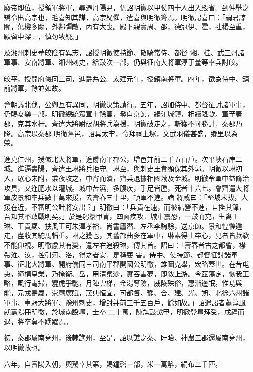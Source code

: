 \begin{pinyinscope}
 廢帝即位，授領軍將軍，尋遷丹陽尹，仍詔明徹以甲仗四十人出入殿省。到仲舉之矯令出高宗也，毛喜知其謀，高宗疑懼，遣喜與明徹籌焉。明徹謂喜曰：「嗣君諒闇，萬機多闕，外鄰彊敵，內有大喪。殿下親實周、邵，德冠伊、霍，社稷至重，願留中深計，慎勿致疑。」



 及湘州刺史華皎陰有異志，詔授明徹使持節、散騎常侍、都督
 湘、桂、武三州諸軍事、安南將軍、湘州刺史，給鼓吹一部，仍與征南大將軍淳于量等率兵討皎。



 皎平，授開府儀同三司，進爵為公。太建元年，授鎮南將軍。四年，徵為侍中、鎮前將軍，餘並如故。



 會朝議北伐，公卿互有異同，明徹決策請行。五年，詔加侍中、都督征討諸軍事，仍賜女樂一部。明徹總統眾軍十餘萬，發自京師，緣江城鎮，相續降款。軍至秦郡，克其水柵。齊遣大將尉破胡將兵為援，明徹破走之，斬獲不可勝計，秦郡乃降。高宗以秦郡
 明徹舊邑，詔具太牢，令拜祠上塚，文武羽儀甚盛，鄉里以為榮。



 進克仁州，授徵北大將軍，進爵南平郡公，增邑并前二千五百戶。次平峽石岸二城。進逼壽陽，齊遣王琳將兵拒守。琳至，與刺史王貴顯保其外郭。明徹以琳初入，眾心未附，乘夜攻之，中宵而潰，齊兵退據相國城及金城。明徹令軍中益脩治攻具，又迮肥水以灌城。城中苦濕，多腹疾，手足皆腫，死者十六七。會齊遣大將軍皮景和率兵數十萬來援，去壽春三十里，頓軍不進。諸
 將咸曰：「堅城未拔，大援在近，不審明公計將安出？」明徹曰：「兵貴在速，而彼結營不進，自挫其鋒，吾知其不敢戰明矣。」於是躬擐甲胄，四面疾攻，城中震恐，一鼓而克，生禽王琳、王貴顯、扶風王可朱渾孝裕、尚書廬潛、左丞李騊駼，送京師。景和惶懼遁走，盡收其駝馬輜重。琳之獲也，其舊部曲多在軍中，琳素得士卒心，見者皆歔欷不能仰視。明徹慮其有變，遣左右追殺琳，傳其首。詔曰：「壽春者古之都會，襟帶淮、汝，控引河、洛，得之者安，是稱要
 害。侍中、使持節、都督征討諸軍事、征北大將軍、開府儀同三司南平郡開國公明徹，雄圖克舉，宏略蓋世。在昔屯夷，締構皇業，乃掩衡、岳，用清氛沴，實吞雲夢，即敘上游。今茲蕩定，恢我王略，風行電掃，貔虎爭馳，月陣雲梯，金湯奪險，威陵殊俗，惠漸邊氓。惟功與能，元戎是屬，崇麾廣賦，茂典恒宜，可都督、豫、合、建、光、朔、北徐六州諸軍事、車騎大將軍、豫州刺史，增封并前三千五百戶，餘如故。」詔遣謁者蕭淳風就壽陽冊明徹，於城南設壇，士卒
 二十萬，陳旗鼓戈甲，明徹登壇拜受，成禮而退，將卒莫不踴躍焉。



 初，秦郡屬南兗州，後隸譙州，至是，詔以譙之秦、盱眙、神農三郡還屬南兗州，以明徹故也。



 六年，自壽陽入朝，輿駕幸其第，賜鐘磬一部，米一萬斛，絹布二千匹。




\end{pinyinscope}
